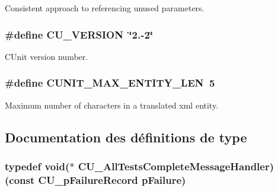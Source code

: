 Consistent approach to referencing unused parameters. 

\hypertarget{group__Framework_gaac14cadefd27f1bb23db3ab4b104ee54}{
\subsubsection[{C\-U\-\_\-\-V\-E\-R\-S\-I\-O\-N}]{\setlength{\rightskip}{0pt plus 5cm}\#define C\-U\-\_\-\-V\-E\-R\-S\-I\-O\-N~\char`\"{}2.-\/2\char`\"{}}}\label{group__Framework_gaac14cadefd27f1bb23db3ab4b104ee54}


C\-Unit version number. 

\hypertarget{group__Framework_ga089820634e54b8284d03d85e8b8e41a7}{
\subsubsection[{C\-U\-N\-I\-T\-\_\-\-M\-A\-X\-\_\-\-E\-N\-T\-I\-T\-Y\-\_\-\-L\-E\-N}]{\setlength{\rightskip}{0pt plus 5cm}\#define C\-U\-N\-I\-T\-\_\-\-M\-A\-X\-\_\-\-E\-N\-T\-I\-T\-Y\-\_\-\-L\-E\-N~5}}\label{group__Framework_ga089820634e54b8284d03d85e8b8e41a7}


Maximum number of characters in a translated xml entity. 



\subsection{Documentation des définitions de type}
\hypertarget{group__Framework_ga5c8cffc5ce2801990436b3e6992bf770}{
\subsubsection[{C\-U\-\_\-\-All\-Tests\-Complete\-Message\-Handler}]{\setlength{\rightskip}{0pt plus 5cm}typedef void($\ast$ C\-U\-\_\-\-All\-Tests\-Complete\-Message\-Handler)(const {\bf C\-U\-\_\-p\-Failure\-Record} p\-Failure)}}\label{group__Framework_ga5c8cffc5ce2801990436b3e6992bf770}


